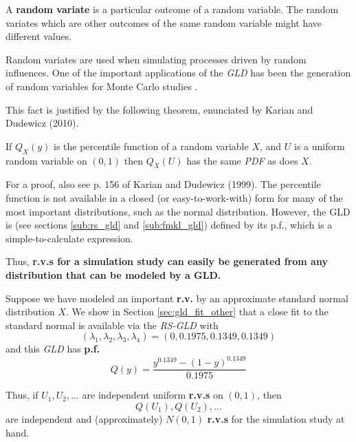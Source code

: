 \begin{defn} 
A \textbf{random variate} is a particular outcome of a random variable. The random variates which are other outcomes of the same random variable might have different values.
\end{defn}

Random variates are used when simulating processes driven by random influences. One of the important applications of the \textit{GLD} has been the generation of random variables for Monte Carlo studies \cite{Mustafa2016}.

This fact is justified by the following theorem, enunciated by Karian and Dudewicz (2010).

\begin{thm}
If $Q_{X}(y)$ is the percentile function of a random variable $X$, and $U$ is a uniform random variable
on $(0, 1)$ then $Q_{X}(U)$ has the same \textit{PDF} as does $X$.
\end{thm}

For a proof, also see p. 156 of Karian and Dudewicz (1999). The percentile function is not available in a closed (or easy-to-work-with) form for many of the most important distributions, such as the normal distribution. However, the GLD is (see sections \ref{sub:rs_gld} and \ref{sub:fmkl_gld}) defined by its p.f., which is a simple-to-calculate expression.

Thus, \textbf{r.v.s for a simulation study can easily be generated from any distribution that can be modeled by a GLD.}

\begin{exmp}
Suppose we have modeled an important \textbf{r.v.} by an approximate standard normal distribution $X$. We show in Section \ref{sec:gld_fit_other} that a close fit to the standard normal is available via the \textit{RS-GLD} with 
\begin{equation}
(\lambda_{1}, \lambda_{2}, \lambda_{3}, \lambda_{4}) = (0, 0.1975, 0.1349, 0.1349)
\end{equation}
and this \textit{GLD} has \textbf{p.f.} 
\begin{equation}
Q(y) = \frac{y^{0.1349}-(1-y)^{0.1349}}{0.1975}
\end{equation}
\end{exmp}

Thus, if $U_{1}, U_{2},...$ are independent uniform \textbf{r.v.s} on $(0, 1)$, then 
\begin{equation}\label{eq:random_variate}
Q(U_{1}), Q(U_{2}),...
\end{equation}
are independent and (approximately) $N(0, 1)$ \textbf{r.v.s} for the simulation study at hand.

